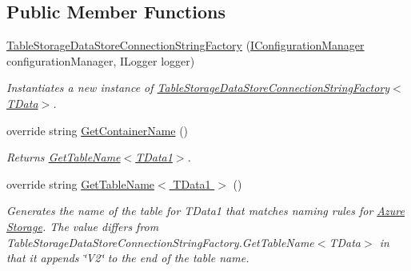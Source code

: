 \subsection*{Public Member Functions}
\begin{DoxyCompactItemize}
\item 
\hyperlink{classCqrs_1_1Azure_1_1Storage_1_1DataStores_1_1TableStorageDataStoreConnectionStringFactory_a72218c0219be3c3185ae98893f0d91e3_a72218c0219be3c3185ae98893f0d91e3}{Table\+Storage\+Data\+Store\+Connection\+String\+Factory} (\hyperlink{interfaceCqrs_1_1Configuration_1_1IConfigurationManager}{I\+Configuration\+Manager} configuration\+Manager, I\+Logger logger)
\begin{DoxyCompactList}\small\item\em Instantiates a new instance of \hyperlink{classCqrs_1_1Azure_1_1Storage_1_1DataStores_1_1TableStorageDataStoreConnectionStringFactory_a72218c0219be3c3185ae98893f0d91e3_a72218c0219be3c3185ae98893f0d91e3}{Table\+Storage\+Data\+Store\+Connection\+String\+Factory$<$\+T\+Data$>$}. \end{DoxyCompactList}\item 
override string \hyperlink{classCqrs_1_1Azure_1_1Storage_1_1DataStores_1_1TableStorageDataStoreConnectionStringFactory_aa31a217ca659f298016bd8ecabe98387_aa31a217ca659f298016bd8ecabe98387}{Get\+Container\+Name} ()
\begin{DoxyCompactList}\small\item\em Returns \hyperlink{classCqrs_1_1Azure_1_1Storage_1_1DataStores_1_1TableStorageDataStoreConnectionStringFactory_a386df8c514b08c9c39583ea9e9a9abe6_a386df8c514b08c9c39583ea9e9a9abe6}{Get\+Table\+Name$<$\+T\+Data1$>$}. \end{DoxyCompactList}\item 
override string \hyperlink{classCqrs_1_1Azure_1_1Storage_1_1DataStores_1_1TableStorageDataStoreConnectionStringFactory_a386df8c514b08c9c39583ea9e9a9abe6_a386df8c514b08c9c39583ea9e9a9abe6}{Get\+Table\+Name$<$ T\+Data1 $>$} ()
\begin{DoxyCompactList}\small\item\em Generates the name of the table for {\itshape T\+Data1}  that matches naming rules for \hyperlink{namespaceCqrs_1_1Azure}{Azure} \hyperlink{namespaceCqrs_1_1Azure_1_1Storage}{Storage}. The value differs from Table\+Storage\+Data\+Store\+Connection\+String\+Factory.\+Get\+Table\+Name$<$\+T\+Data$>$ in that it appends \char`\"{}\+V2\char`\"{} to the end of the table name. \end{DoxyCompactList}\end{DoxyCompactItemize}


